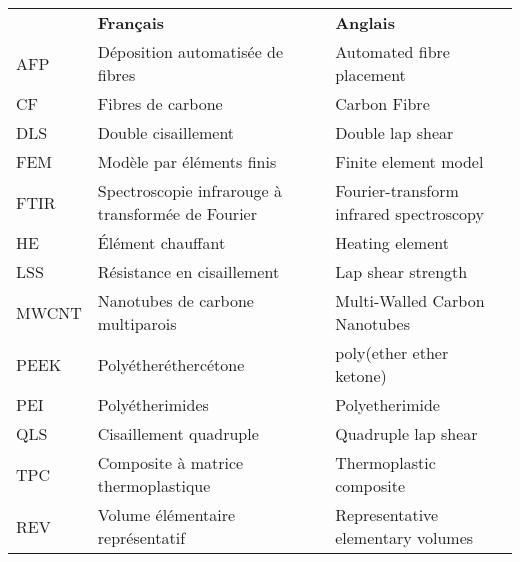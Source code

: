 \begin{longtable}{p{0.75in}>{\raggedright\arraybackslash}p{2.5in} p{2.5in}}
	      & \textbf{Français}                                              & \textbf{Anglais}                                                \\
	AFP   & Déposition automatisée de fibres                               & Automated fibre placement                                       \\
	CF    & Fibres de carbone                                              & Carbon Fibre                                                    \\
	DLS   & Double cisaillement                                            & Double lap shear                                                \\
	FEM   & Modèle par éléments finis                                      & Finite element model                                            \\
	FTIR  & Spectroscopie infrarouge à transformée de Fourier              & Fourier-transform infrared spectroscopy                         \\
	HE    & Élément chauffant                                              & Heating element                                                 \\
	LSS   & Résistance en cisaillement                                     & Lap shear strength                                              \\
	MWCNT & Nanotubes de carbone multiparois                               & Multi-Walled Carbon Nanotubes                                   \\
	PEEK  & Polyétheréthercétone                                           & poly(ether ether ketone)                                        \\
	PEI   & Polyétherimides                                                & Polyetherimide                                                  \\
	QLS   & Cisaillement quadruple                                         & Quadruple lap shear                                             \\
	TPC   & Composite à matrice thermoplastique                            & Thermoplastic composite                                         \\
	REV   & Volume élémentaire représentatif                               & Representative elementary volumes                               \\

\end{longtable}
